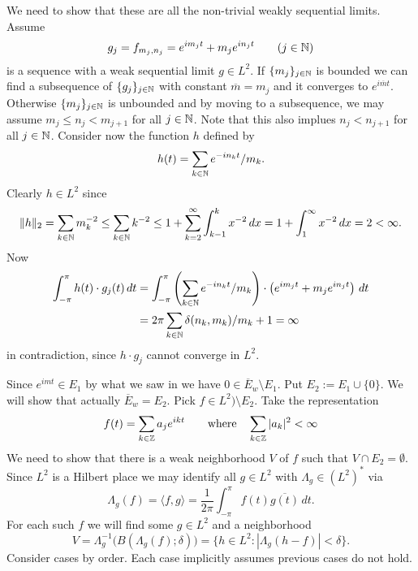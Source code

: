 \begin{enumerate}
\begin{itemize}
We need to show that these are all the non-trivial weakly sequential limits.
Assume
\begin{equation*}
g_j = f_{m_j,n_j} = e^{im_jt} + m_j e^{in_jt} \qquad (j\in\mathbb{N})
\end{equation*}
is a sequence with a weak sequential limit \(g\in L^2\).
If \(\{m_j\}_{j\in\mathbb{N}}\) is bounded we can find a subsequence
of \(\{g_j\}_{j\in\mathbb{N}}\) with constant \(\overline{m}=m_j\) and it converges
to \(e^{i\overline{m}t}\).
Otherwise \(\{m_j\}_{j\in\mathbb{N}}\) is unbounded and by moving to a subsequence,
we may assume \(m_j \leq n_j < m_{j+1}\) for all \(j\in\mathbb{N}\).
Note that this also implues \(n_j < n_{j+1}\) for all \(j\in\mathbb{N}\).
Consider now the
function $h$ defined by
\begin{equation*}
h(t) = \sum_{k\in\mathbb{N}} e^{-in_k t} / m_k.
\end{equation*}
Clearly \(h\in L^2\) since
\begin{equation*}
\|h\|_2 = \sum_{k\in\mathbb{N}} m_k^{-2} \leq \sum_{k\in\mathbb{N}} k^{-2}
\leq 1 + \sum_{k=2}^\infty \int_{k-1}^{k} x^{-2}\,dx
= 1 + \int_1^\infty x^{-2}\,dx = 2 < \infty.
\end{equation*}
Now
\begin{align*}
\int_{-\pi}^\pi h(t)\cdot g_j(t)\,dt
&= \int_{-\pi}^\pi \left(\sum_{k\in\mathbb{N}} e^{-in_k t} / m_k\right)
                \cdot \left(e^{im_jt} + m_j e^{in_jt}\right)\,dt
  \\
&= 2\pi \sum_{k\in\mathbb{N}} \delta(n_k,m_k)/m_k + 1 = \infty
\end{align*}
in contradiction, since \(h \cdot g_j\) cannot converge in \(L^2\).

Since \(e^{imt} \in E_1\) by what we saw in  we have
\(0 \in \overline{E}_w\setminus E_1\).
Put \(E_2 := E_1 \cup \{0\}\).
We will show that actually \(\overline{E}_w = E_2\).
Pick
\(f\in L^2) \setminus E_2\). Take the representation
\begin{equation*}
f(t) = \sum_{k\in\mathbb{Z}} a_je^{ikt}
\qquad \textnormal{where}\quad
\sum_{k\in\mathbb{Z}} |a_k|^2 < \infty
\end{equation*}
We need to show that there is a weak neighborhood $V$ of $f$
such that \(V\cap E_2 = \emptyset\).
Since \(L^2\) is a Hilbert place
we may identify all \(g\in L^2\) with \(\Lambda_g\in (L^2)^*\)
via
\begin{equation*}
\Lambda_g(f) = \langle f, g\rangle
 = \frac{1}{2\pi} \int_{-\pi}^\pi f(t)\overline{g(t)}\,dt.
\end{equation*}
For each such $f$ we will find some \(g\in L^2\) and a neighborhood
\begin{equation*}
V = \Lambda_g^{-1}\bigl(B(\Lambda_g(f);\delta)\bigr)
  = \{h\in L^2: |\Lambda_g(h-f)| < \delta\}.
\end{equation*}
Consider cases by order.
Each case implicitly  assumes previous cases do not hold.

\end{itemize}
\end{enumerate}
